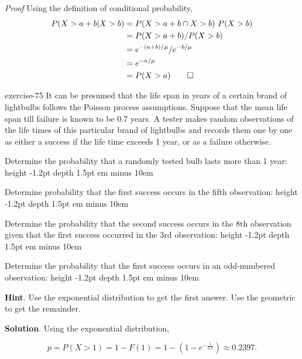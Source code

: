 \documentclass[10pt,]{book}
\makeatletter
\newcommand{\fillin}[1]{\leavevmode\leaders\vrule height -1.2pt depth 1.5pt \hskip #1em minus #1em \null}
\renewcommand*{\proofname}{Proof}
\renewenvironment{proof}[1][\proofname]{\par
  \pushQED{\qed}%
  \normalfont \topsep6\p@\@plus6\p@\relax
  \trivlist
  \item\relax
    {\itshape
    #1\@addpunct{.}}\hspace\labelsep\ignorespaces
}{%
  \popQED\endtrivlist\@endpefalse
}
\numberwithin{equation}{section}
\newcommand{\gt}{>}
\makeatother
\begin{document}
\begin{proof}\hypertarget{proof-58}{}
\hypertarget{p-1092}{}%
Using the definition of conditional probability,%
\begin{align*}
P( X > a + b | X > b ) & = P( X > a + b \cap X > b ) \ P( X > b)\\
& = P( X > a + b ) / P( X > b)\\
& = e^{-(a+b)/ \mu} / e^{-b / \mu}\\
& = e^{-a/ \mu}\\
& = P(X > a)\qedhere
\end{align*}
%
\end{proof}
%
\par
\hypertarget{p-1093}{}%
\begin{inlineexercise}{}{exercise-75}%
\hypertarget{p-1102}{}%
It can be presumed that the life span in years of a certain brand of lightbulbs follows the Poisson process assumptions.  Suppose that the mean life span till failure is known to be 0.7 years. A tester makes random observations of the life times of this particular brand of lightbulbs and records them one by one as either a success if the life time exceeds 1 year, or as a failure otherwise.%
\par
\hypertarget{p-1103}{}%
Determine the probability that a randomly tested bulb lasts more than 1 year:  \fillin{10}%
\par
\hypertarget{p-1104}{}%
Determine probability that the first success occurs in the fifth observation:  \fillin{10}%
\par
\hypertarget{p-1105}{}%
Determine the probability that the second success occurs in the 8th observation given that the first success occurred in the 3rd observation:   \fillin{10}%
\par
\hypertarget{p-1106}{}%
Determine the probability that the first success occurs in an odd-numbered observation:  \fillin{10}%
\par\smallskip%
\noindent\textbf{Hint}.\hypertarget{hint-8}{}\quad%
\hypertarget{p-1107}{}%
Use the exponential distribution to get the first answer. Use the geometric to get the remainder.%
\par\smallskip%
\noindent\textbf{Solution}.\hypertarget{solution-35}{}\quad%
\hypertarget{p-1108}{}%
Using the exponential distribution,%
\par
\hypertarget{p-1109}{}%
%
\begin{equation*}
p = P(X \gt 1) = 1 - F(1) = 1 - (1-e^{-\frac{1}{0.7}}) \approx 0.2397.
\end{equation*}

\end{inlineexercise}
\end{document}
